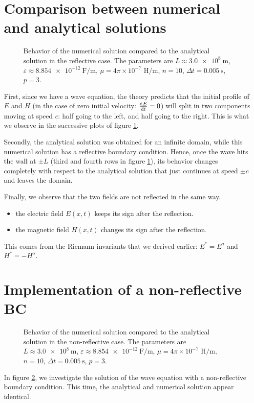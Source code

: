 \documentclass[11 pt]{article}
\begin{document}
\section{Comparison between numerical and analytical solutions}
\begin{figure}[H]
    \centering
    
    \caption{Behavior of the numerical solution compared to the analytical solution in the reflective case. The parameters are $L \approx \SI{3.0e+8}{\m}$, $\varepsilon \approx \SI[per-mode=symbol]{8.854e-12}{\farad\per\m}$, $\mu = 4 \pi \times 10^{-7}\text{ H/m}$, $n=10$, $\Delta t= \SI{0.005}{\s}$, $p=3$.}
    \label{fig:reflective}
\end{figure}

\vspace{-4mm}
First, since we have a wave equation, the theory predicts that the initial profile of $E$ and $H$ (in the case of zero initial velocity: $\dv{E}{t}(0)=0$) will split in two components moving at speed $c$: half going to the left, and half going to the right. This is what we observe in the successive plots of figure \ref{fig:reflective}.

Secondly, the analytical solution was obtained for an infinite domain, while this numerical solution has a reflective boundary condition. Hence, once the wave hits the wall at $\pm L$ (third and fourth rows in figure \ref{fig:reflective}), its behavior changes completely with respect to the analytical solution that just continues at speed $\pm c$ and leaves the domain.

Finally, we observe that the two fields are not reflected in the same way.
\begin{itemize}[topsep=0pt, label=---]
    \item the electric field $E(x,t)$ keeps its sign after the reflection.
    \item the magnetic field $H(x,t)$ changes its sign after the reflection.
\end{itemize}
This comes from the Riemann invariants that we derived earlier: $E^* = E^a$ and $H^* = -H^a$.

\section{Implementation of a non-reflective BC}
\begin{figure}[H]
    \centering
    
    \caption{Behavior of the numerical solution compared to the analytical solution in the non-reflective case. The parameters are $L \approx \SI{3.0e+8}{\m}$, $\varepsilon \approx \SI[per-mode=symbol]{8.854e-12}{\farad\per\m}$, $\mu = 4 \pi \times 10^{-7}\text{ H/m}$, $n=10$, $\Delta t= \SI{0.005}{\s}$, $p=3$.}
    \label{fig:infinite}
\end{figure}
\vspace{-3mm}
In figure \ref{fig:infinite}, we investigate the solution of the wave equation with a non-reflective boundary condition. This time, the analytical and numerical solution appear identical.

\vspace{-3mm}
\nocite{*}
\printbibliography
\end{document}
